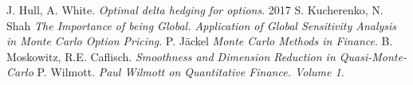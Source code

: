 \documentclass{article}
\begin{document}
\begin{thebibliography}{9}
J. Hull, A. White. \textit{Optimal delta hedging for options}. 2017
S. Kucherenko, N. Shah \textit{The Importance of being Global. Application of Global Sensitivity Analysis in Monte Carlo Option Pricing}.
P. J{\"a}ckel \textit{Monte Carlo Methods in Finance}.
B. Moskowitz, R.E. Caflisch. \textit{Smoothness and Dimension Reduction in Quasi-Monte-Carlo}
P. Wilmott. \textit{Paul Wilmott on Quantitative Finance. Volume 1.}
\end{thebibliography}
\end{document}
